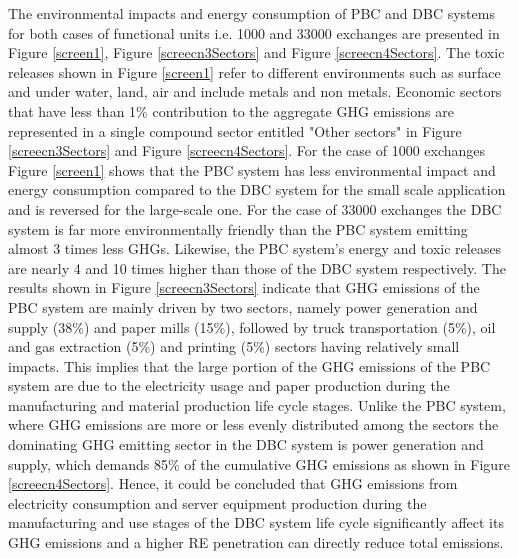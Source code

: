 \documentclass[3p,times,procedia]{elsarticle}
\begin{document}
The environmental impacts and energy consumption of PBC and DBC systems for both cases of functional units i.e. 1000 and 33000 exchanges are presented in Figure \ref{screen1}, Figure \ref{screecn3Sectors} and Figure \ref{screecn4Sectors}. The toxic releases shown in Figure \ref{screen1} refer to different environments such as surface and under water, land, air and include metals and non metals. Economic sectors that have less than 1\% contribution to the aggregate GHG emissions are represented in a single compound sector entitled "Other sectors" in Figure \ref{screecn3Sectors} and Figure \ref{screecn4Sectors}. For the case of 1000 exchanges Figure \ref{screen1} shows that the PBC system has less environmental impact and energy consumption compared to the DBC system for the small scale application and is reversed for the large-scale one. For the case of 33000 exchanges the DBC system is far more environmentally friendly than the PBC system emitting almost 3 times less GHGs. Likewise, the PBC system's energy and toxic releases are nearly 4 and 10 times higher than those of the DBC system respectively. The results shown in Figure \ref{screecn3Sectors} indicate that GHG emissions of the PBC system are mainly driven by two sectors, namely power generation and supply (38\%) and paper mills (15\%), followed by truck transportation (5\%), oil and gas extraction (5\%) and printing (5\%) sectors having relatively small impacts. This implies that the large portion of the GHG emissions of the PBC system are due to the electricity usage and paper production during the manufacturing and material production life cycle stages. Unlike the PBC system, where GHG emissions are more or less evenly distributed among the sectors the dominating GHG emitting sector in the DBC system is power generation and supply, which demands 85\% of the cumulative GHG emissions as shown in Figure \ref{screecn4Sectors}. Hence, it could be concluded that GHG emissions from electricity consumption and server equipment production during the manufacturing and use stages of the DBC system life cycle significantly affect its GHG emissions and a higher RE penetration can directly reduce total emissions. 
\end{document}
